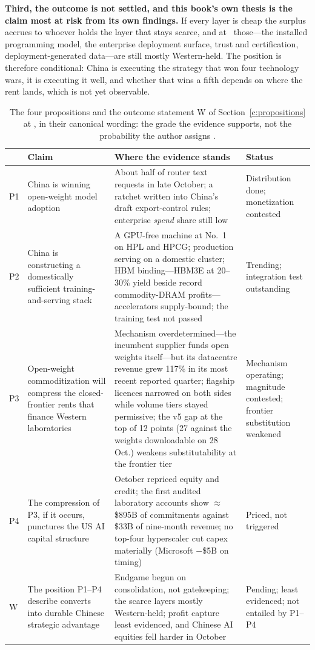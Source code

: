 \textbf{Third, the outcome is not settled, and this book's own thesis is the claim most at risk from its own findings.} If every layer is cheap the surplus accrues to whoever holds the layer that stays scarce, and at \datafreeze\ those---the installed programming model, the enterprise deployment surface, trust and certification, deployment-generated data---are still mostly Western-held. The position is therefore conditional: China is executing the strategy that won four technology wars, it is executing it well, and whether that wins a fifth depends on where the rent lands, which is not yet observable.

\begin{table}[htbp]
\centering\scriptsize
\caption{The four propositions and the outcome statement W of Section~\ref{c:propositions} at \datafreeze, in their canonical wording: the grade the evidence supports, not the probability the author assigns .}
\label{tab:summary-props}
\begin{tabular}{@{}p{7mm}p{38mm}p{65mm}p{29mm}@{}}
\toprule
& \textbf{Claim} & \textbf{Where the evidence stands} & \textbf{Status} \\
\midrule
P1 & China is winning open-weight model adoption & About half of router text requests in late October; a ratchet written into China's draft export-control rules; enterprise \emph{spend} share still low & Distribution done; monetization contested \\
\addlinespace
P2 & China is constructing a domestically sufficient training-and-serving stack & A GPU-free machine at No.~1 on HPL and HPCG; production serving on a domestic cluster; HBM binding---HBM3E at 20--30\% yield beside record commodity-DRAM profits---accelerators supply-bound; the training test not passed & Trending; integration test outstanding \\
\addlinespace
P3 & Open-weight commoditization will compress the closed-frontier rents that finance Western laboratories & Mechanism overdetermined---the incumbent supplier funds open weights itself---but its datacentre revenue grew 117\% in its most recent reported quarter; flagship licences narrowed on both sides while volume tiers stayed permissive; the v5 gap at the top of 12 points (27 against the weights downloadable on 28 Oct.) weakens substitutability at the frontier tier & Mechanism operating; magnitude contested; frontier substitution weakened \\
\addlinespace
P4 & The compression of P3, if it occurs, punctures the US AI capital structure & October repriced equity and credit; the first audited laboratory accounts show $\approx$\$895B of commitments against \$33B of nine-month revenue; no top-four hyperscaler cut capex materially (Microsoft $-$\$5B on timing) & Priced, not triggered \\
\addlinespace
W & The position P1--P4 describe converts into durable Chinese strategic advantage & Endgame begun on consolidation, not gatekeeping; the scarce layers mostly Western-held; profit capture least evidenced, and Chinese AI equities fell harder in October & Pending; least evidenced; not entailed by P1--P4 \\
\bottomrule
\end{tabular}
\end{table}

